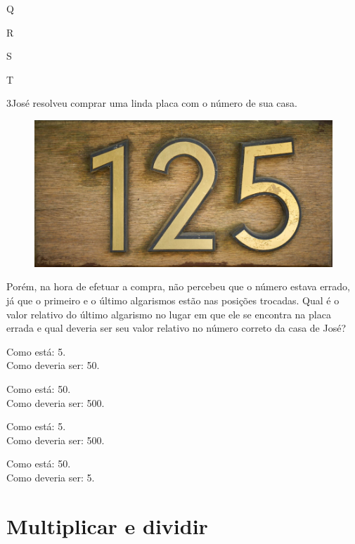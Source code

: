 \begin{multicols}{2}
\begin{escolha}
\item
  Q
\item
  R
\item
  S
\item
  T
\end{escolha}
\end{multicols}


\num{3}José resolveu comprar uma linda placa com o número de sua casa.

\begin{figure}[htpb!]
\centering
\includegraphics[width=.65\textwidth]{./imgs/mat1.png}
\end{figure}

Porém, na hora de efetuar a compra, não percebeu que o número estava
errado, já que o primeiro e o último algarismos estão nas posições
trocadas. Qual é o valor relativo do último algarismo no lugar em que ele se
encontra na placa errada e qual deveria ser seu valor relativo no número
correto da casa de José?\bigskip

\begin{escolha}
\item
  Como está: 5.\\
  Como deveria ser: 50.
\item
  Como está: 50.\\
  Como deveria ser: 500.
\item
  Como está: 5.\\
  Como deveria ser: 500.
\item
  Como está: 50.\\
  Como deveria ser: 5.
\end{escolha}


\chapter{Multiplicar e dividir}

